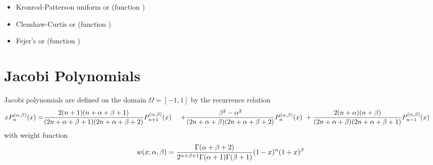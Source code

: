\documentclass[letterpaper,10pt,english]{sphinxmanual}
\begin{document}
\begin{description}
\begin{itemize}
\item {} 
Kronrod-Patterson uniform or  (function )

\item {} 
Clenshaw-Curtis or  (function )

\item {} 
Fejer's or  (function )

\end{itemize}

\end{description}


\section{Jacobi Polynomials}
\label{index:jacobi-polynomials}\label{index:ref-jacobi}
Jacobi polynomials are defined on the domain \(\Omega=[-1,1]\) by the recurrence relation
\begin{gather}
\begin{split}xP^{(\alpha,\beta)}_n(x) =    & \frac{2(n+1)(n+\alpha+\beta+1)}{(2n+\alpha+\beta+1)(2n+\alpha+\beta+2)} P^{(\alpha,\beta)}_{n+1}(x) \
                                & + \frac{\beta^2 - \alpha^2}{(2n+\alpha+\beta)(2n+\alpha+\beta+2)} P^{(\alpha,\beta)}_{n}(x) \
                                & + \frac{2(n+\alpha)(n+\beta)}{(2n+\alpha+\beta)(2n+\alpha+\beta+1)} P^{(\alpha,\beta)}_{n-1}(x)\end{split}\notag
\end{gather}
with weight function
\begin{gather}
\begin{split}w(x;\alpha,\beta) = \frac{\Gamma(\alpha+\beta+2)}{2^{\alpha+\beta+1}\Gamma(\alpha+1)\Gamma(\beta+1)}(1-x)^\alpha (1+x)^\beta\end{split}\notag
\end{gather}
\end{document}
